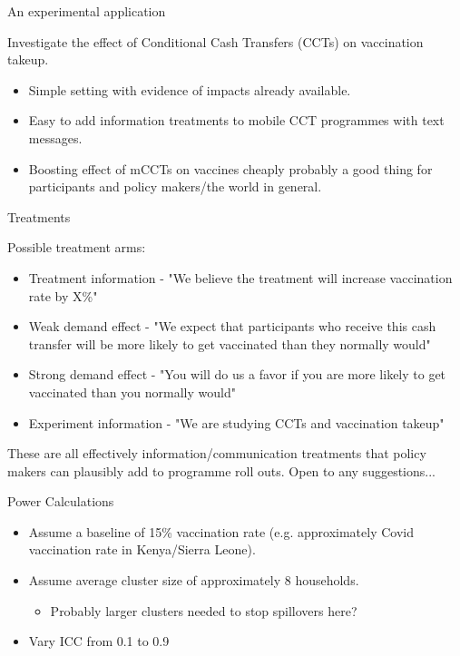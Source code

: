 \documentclass[aspectratio=169,xcolor=dvipsnames]{beamer}
\begin{document}
\begin{frame}{An experimental application}

    Investigate the effect of Conditional Cash Transfers (CCTs) on vaccination takeup.

    \begin{itemize}
        \item Simple setting with evidence of impacts already available.
        \item Easy to add information treatments to mobile CCT programmes with text messages.
        \item Boosting effect of mCCTs on vaccines cheaply probably a good thing for participants and policy makers/the 
        world in general.
    \end{itemize}





    

\end{frame}

\begin{frame}{Treatments}


    Possible treatment arms:

    \begin{itemize}
        \item Treatment information - "We believe the treatment will increase vaccination rate by X\%"
        \item Weak demand effect - "We expect that participants who receive this cash transfer will 
        be more likely to get vaccinated  than they normally would"
        \item Strong demand effect - "You will do us a favor if you are more likely to get vaccinated than you normally would" 
        \item Experiment information - "We are studying CCTs and vaccination takeup"
    \end{itemize}
    
    These are all effectively information/communication treatments that policy makers 
    can plausibly add to programme roll outs.
   \vfill 
    Open to any suggestions...

\end{frame}

\begin{frame}{Power Calculations}

\begin{itemize}
    \item Assume a baseline of 15\% vaccination rate (e.g. approximately Covid vaccination 
    rate in Kenya/Sierra Leone).
    \item Assume average cluster size of approximately 8 households.
    \begin{itemize}
        \item Probably larger clusters needed to stop spillovers here?
    \end{itemize}     
    \item Vary ICC from 0.1 to 0.9
\end{itemize}
\end{frame}
\end{document}
